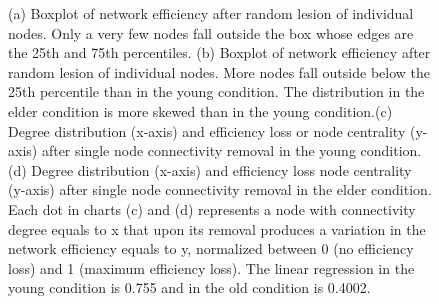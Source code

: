\documentclass[12pt,a4paper]{article}
\begin{document}
\begin{figure}[!ht]
{    }
    \caption{\small (a) Boxplot of network efficiency after random lesion of individual nodes. Only a very few nodes fall outside the box whose edges are the 25th and 75th percentiles. \small (b) Boxplot of network efficiency after random lesion of individual nodes. More nodes fall outside below the 25th percentile than in the young condition. The distribution in the elder condition is more skewed than in the young condition.\small (c) Degree distribution (x-axis) and efficiency loss or node centrality (y-axis) after single node connectivity removal in the young condition.  
  \small (d)  Degree distribution (x-axis) and efficiency loss node centrality (y-axis) after single node connectivity removal in the elder condition. Each dot in charts \small (c) and \small (d) represents a node with connectivity degree equals to x that upon its removal produces a variation in the network efficiency equals to y, normalized between 0 (no efficiency loss) and 1 (maximum efficiency loss). The linear regression in the young condition is 0.755 and in the old condition is 0.4002.}
    \label{fig:boxplot}
  \end{figure}
\end{document}

